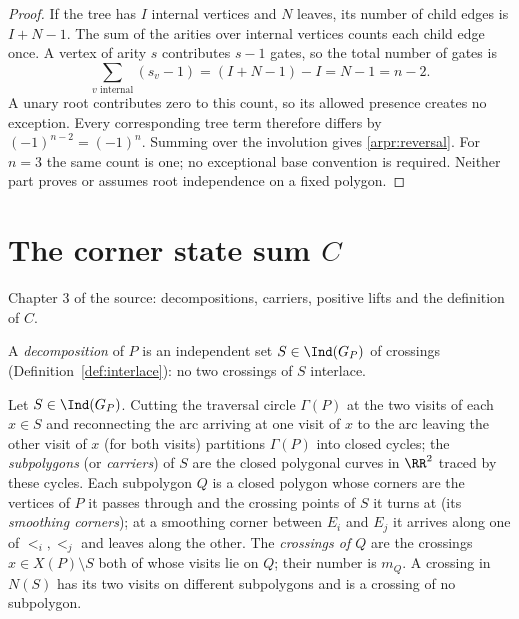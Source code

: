 \begin{proof}
If the tree has $I$ internal vertices and $N$ leaves, its number of
child edges is $I+N-1$. The sum of the arities over internal vertices
counts each child edge once. A vertex of arity $s$ contributes $s-1$
gates, so the total number of gates is
\begin{equation}\label{arpr:gate-count}
\sum_{v\text{ internal}}(s_v-1)
=(I+N-1)-I=N-1=n-2.
\end{equation}
A unary root contributes zero to this count, so its allowed presence
creates no exception. Every corresponding tree term therefore differs
by $(-1)^{n-2}=(-1)^n$. Summing over the involution gives
\eqref{arpr:reversal}. For $n=3$ the same count is one; no exceptional
base convention is required. Neither part proves or assumes root
independence on a fixed polygon.
\end{proof}

\chapter{The corner state sum $C$}
Chapter 3 of the source: decompositions, carriers, positive lifts and the definition of $C$.

\begin{definition}[decomposition]\label{def:decomposition}\leanok{}
A \emph{decomposition} of $P$ is an independent set $S\in\Ind(G_P)$ of
crossings (Definition~\ref{def:interlace}): no two crossings of $S$ interlace.
\end{definition}

\begin{definition}\label{def:smoothing}\leanok
Let $S\in\Ind(G_P)$. Cutting the traversal circle $\Gamma(P)$ at the two
visits of each $x\in S$ and reconnecting the arc arriving at one visit of $x$
to the arc leaving the other visit of $x$ (for both visits) partitions
$\Gamma(P)$ into closed cycles; the \emph{subpolygons} (or \emph{carriers})
of $S$ are the closed polygonal curves in $\RR^2$ traced by these cycles. Each
subpolygon $Q$ is a closed polygon whose corners are the vertices of $P$ it
passes through and the crossing points of $S$ it turns at (its
\emph{smoothing corners}); at a smoothing corner between $E_i$ and $E_j$ it
arrives along one of $\lt_i,\lt_j$ and leaves along the other. The
\emph{crossings of $Q$} are the crossings $x\in X(P)\setminus S$ both of whose
visits lie on $Q$; their number is $m_Q$. A crossing in $N(S)$ has its two
visits on different subpolygons and is a crossing of no subpolygon.
\end{definition}

